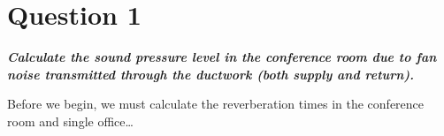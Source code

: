 \section{Question 1}

\textbf{\textit{Calculate the sound pressure level in the conference room due to fan noise transmitted through the ductwork (both supply and return).}}


Before we begin, we must calculate the reverberation times in the conference room and single office\ldots